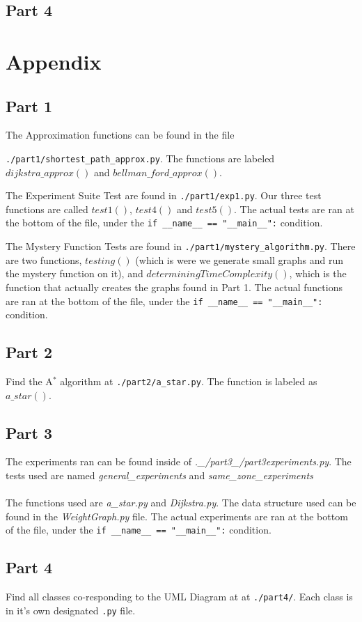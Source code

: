 \documentclass{article}
\begin{document}
\subsection{Part 4}


\newpage
\section{Appendix}

\subsection{Part 1}

The Approximation functions can be found in the file

\verb|./part1/shortest_path_approx.py|.
The functions are labeled $dijkstra\_approx()$ and $bellman\_ford\_approx()$.

The Experiment Suite Test are found in \verb|./part1/exp1.py|. Our three test functions are called $test1()$, $test4()$ and  $test5()$. The actual tests are ran at the bottom of the file, under the \verb|if __name__ == "__main__":| condition.

The Mystery Function Tests are found in \verb|./part1/mystery_algorithm.py|. There are two functions, $testing()$ (which is were we generate small graphs and run the mystery function on it), and $determiningTimeComplexity()$, which is the function that actually creates the graphs found in Part 1. The actual functions are ran at the bottom of the file, under the \verb|if __name__ == "__main__":| condition.

\subsection{Part 2}

Find the A$^{*}$ algorithm at \verb|./part2/a_star.py|. The function is labeled as $a\_star()$.

\subsection{Part 3}

The experiments ran can be found inside of \emph{.\_/part3\_/part3experiments.py}. The tests used are named \emph{general\_experiments} and \emph{same\_zone\_experiments} \\
\\
The functions used are \emph{a\_star.py} and \emph{Dijkstra.py}. The data structure used can be found in the \emph{WeightGraph.py} file. The actual experiments are ran at the bottom of the file, under the \verb|if __name__ == "__main__":| condition.

\subsection{Part 4}


Find all classes co-responding to the UML Diagram at at \verb|./part4/|. Each class is in it's own designated \verb|.py| file.
\end{document}
